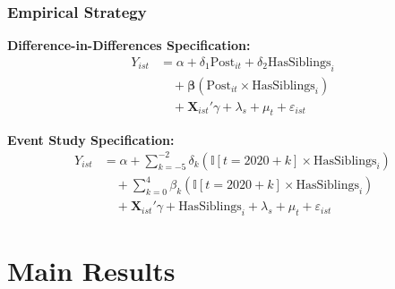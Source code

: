 \documentclass{beamer}
\begin{document}
\begin{frame}
    \label{frame:empirical}
    \frametitle{Empirical Strategy}

    
    \textbf{Difference-in-Differences Specification:}
    \small
    \begin{align}
    Y_{ist} &= \alpha + \delta_1 \text{Post}_{it} + \delta_2 \text{HasSiblings}_{i} \nonumber  \\
    &\quad + \boldsymbol{\beta} (\text{Post}_{it} \times \text{HasSiblings}_{i}) \nonumber \\
    &\quad + \mathbf{X}_{ist}'\gamma + \lambda_s + \mu_t + \varepsilon_{ist}
    \end{align}
    
    \vspace{0.1cm}
    
    \textbf{Event Study Specification:}
    \begin{align}
    Y_{ist} &= \alpha + \sum_{k=-5}^{-2} \delta_k (\mathbb{I}[t = 2020+k] \times \text{HasSiblings}_{i}) \nonumber \\
    & \quad + \sum_{k=0}^{4} \beta_k (\mathbb{I}[t = 2020 + k] \times \text{HasSiblings}_{i}) \nonumber \\
    & \quad + \mathbf{X}_{ist}'\gamma + \text{HasSiblings}_{i} + \lambda_s + \mu_t + \varepsilon_{ist}
    \end{align}
    \normalsize
    
    
\end{frame}



\section{Main Results}

    


\end{document}
